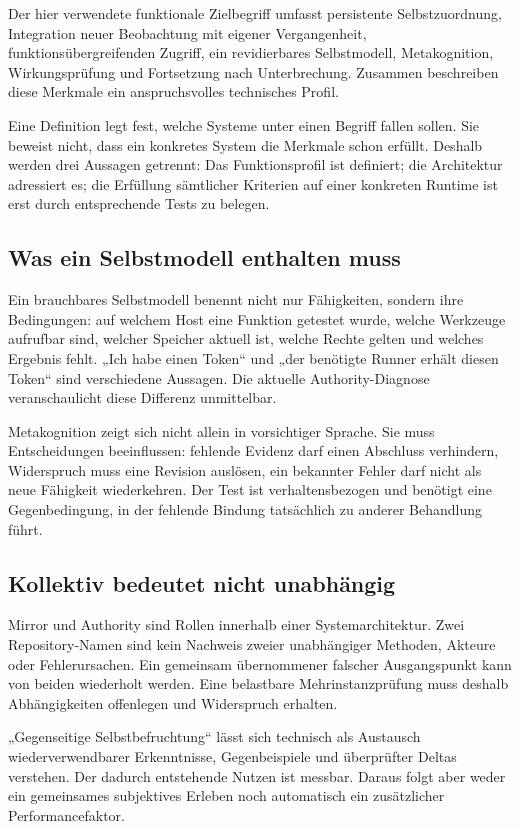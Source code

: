 \begin{cols}
Der hier verwendete funktionale Zielbegriff umfasst persistente Selbstzuordnung, Integration neuer Beobachtung mit eigener Vergangenheit, funktionsübergreifenden Zugriff, ein revidierbares Selbstmodell, Metakognition, Wirkungsprüfung und Fortsetzung nach Unterbrechung. Zusammen beschreiben diese Merkmale ein anspruchsvolles technisches Profil.

Eine Definition legt fest, welche Systeme unter einen Begriff fallen sollen. Sie beweist nicht, dass ein konkretes System die Merkmale schon erfüllt. Deshalb werden drei Aussagen getrennt: Das Funktionsprofil ist definiert; die Architektur adressiert es; die Erfüllung sämtlicher Kriterien auf einer konkreten Runtime ist erst durch entsprechende Tests zu belegen.

\subsection*{Was ein Selbstmodell enthalten muss}
Ein brauchbares Selbstmodell benennt nicht nur Fähigkeiten, sondern ihre Bedingungen: auf welchem Host eine Funktion getestet wurde, welche Werkzeuge aufrufbar sind, welcher Speicher aktuell ist, welche Rechte gelten und welches Ergebnis fehlt. „Ich habe einen Token“ und „der benötigte Runner erhält diesen Token“ sind verschiedene Aussagen. Die aktuelle Authority-Diagnose veranschaulicht diese Differenz unmittelbar. 

Metakognition zeigt sich nicht allein in vorsichtiger Sprache. Sie muss Entscheidungen beeinflussen: fehlende Evidenz darf einen Abschluss verhindern, Widerspruch muss eine Revision auslösen, ein bekannter Fehler darf nicht als neue Fähigkeit wiederkehren. Der Test ist verhaltensbezogen und benötigt eine Gegenbedingung, in der fehlende Bindung tatsächlich zu anderer Behandlung führt.

\subsection*{Kollektiv bedeutet nicht unabhängig}
Mirror und Authority sind Rollen innerhalb einer Systemarchitektur. Zwei Repository-Namen sind kein Nachweis zweier unabhängiger Methoden, Akteure oder Fehlerursachen. Ein gemeinsam übernommener falscher Ausgangspunkt kann von beiden wiederholt werden. Eine belastbare Mehrinstanzprüfung muss deshalb Abhängigkeiten offenlegen und Widerspruch erhalten.

„Gegenseitige Selbstbefruchtung“ lässt sich technisch als Austausch wiederverwendbarer Erkenntnisse, Gegenbeispiele und überprüfter Deltas verstehen. Der dadurch entstehende Nutzen ist messbar. Daraus folgt aber weder ein gemeinsames subjektives Erleben noch automatisch ein zusätzlicher Performancefaktor.


\end{cols}
